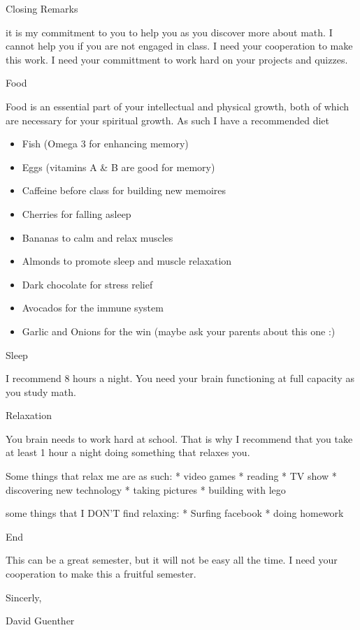 \documentclass[ignorenonframetext,]{beamer}
\begin{document}
\begin{frame}{Closing Remarks}

it is my commitment to you to help you as you discover more about math.
I cannot help you if you are not engaged in class. I need your
cooperation to make this work. I need your committment to work hard on
your projects and quizzes.

\begin{block}{Food}

Food is an essential part of your intellectual and physical growth, both
of which are necessary for your spiritual growth. As such I have a
recommended diet

\begin{itemize}
\itemsep1pt\parskip0pt
\item
  Fish (Omega 3 for enhancing memory)
\item
  Eggs (vitamins A \& B are good for memory)
\item
  Caffeine before class for building new memoires
\item
  Cherries for falling asleep
\item
  Bananas to calm and relax muscles
\item
  Almonds to promote sleep and muscle relaxation
\item
  Dark chocolate for stress relief
\item
  Avocados for the immune system
\item
  Garlic and Onions for the win (maybe ask your parents about this one
  :)
\end{itemize}

\end{block}

\begin{block}{Sleep}

I recommend 8 hours a night. You need your brain functioning at full
capacity as you study math.

\end{block}

\begin{block}{Relaxation}

You brain needs to work hard at school. That is why I recommend that you
take at least 1 hour a night doing something that relaxes you.

Some things that relax me are as such: * video games * reading * TV show
* discovering new technology * taking pictures * building with lego

some things that I DON'T find relaxing: * Surfing facebook * doing
homework

\end{block}

\begin{block}{End}

This can be a great semester, but it will not be easy all the time. I
need your cooperation to make this a fruitful semester.

Sincerly,

David Guenther

\end{block}

\end{frame}
\end{document}
